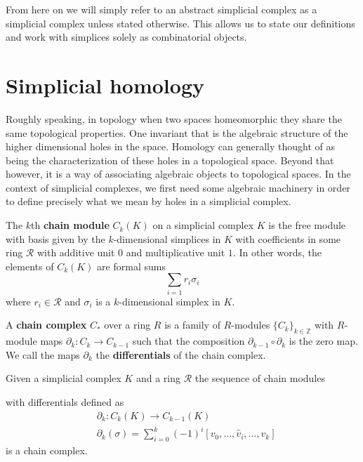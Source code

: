 From here on we will simply refer to an abstract simplicial complex as a simplicial complex unless stated otherwise. This allows us to state our definitions and work with simplices solely as combinatorial objects.
\section{Simplicial homology}
Roughly speaking, in topology when two spaces homeomorphic they share the same topological properties. One invariant that is the algebraic structure of the higher dimensional holes in the space.
Homology can generally thought of as being the characterization of these holes in a topological space. Beyond that however, it is a way of associating algebraic objects to topological spaces. In the context of simplicial complexes, we first need some algebraic machinery in order to define precisely what we mean by holes in a simplicial complex.

\begin{definition}
  The $k$th \textbf{chain module} $C_{k}(K)$ on a simplicial complex $K$ is the free module with basis given by the $k$-dimensional simplices in $K$ with coefficients in some ring $\mathcal{R}$ with additive unit $0$ and multiplicative unit $1$. In other words, the elements of $C_{k}(K)$ are formal sums
  \[ \sum_{i=1} r_{i}\sigma_{i}\]
  where $r_{i} \in \mathcal{R}$ and $\sigma_{i}$ is a $k$-dimensional simplex in $K$.
\end{definition}
\begin{definition}
  A \textbf{chain complex} $C_{*}$ over a ring $R$ is a family of $R$-modules $\{C_{k}\}_{k
  \in \mathbb{Z}}$ with $R$-module maps $\partial_{k}: C_{k} \to C_{k-1}$ such that the composition $\partial_{k-1} \circ \partial_{k}$ is the zero map. We call the maps $\partial_{k}$ the \textbf{differentials} of the chain complex.
\end{definition}

\begin{theorem}\label{simpchainthm}
Given a simplicial complex $K$ and a ring $\mathcal{R}$ the sequence of chain modules
\begin{center}
\end{center}
with differentials defined as
\begin{align*}
& \partial_{k}:  C_{k}(K) \to C_{k-1}(K) \\
& \partial_{k}(\sigma) =  \sum^{k}_{{i=0}} (-1)^{i} [v_{0},\dots,\hat v_{i}, \dots, v_{k}]
\end{align*}
is a chain complex.
\end{theorem}

